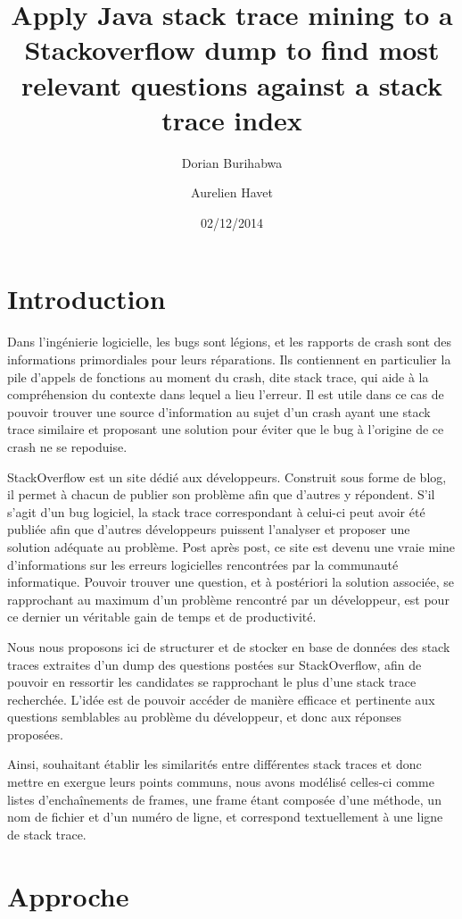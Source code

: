 \documentclass[11pt,a4paper]{article}
\author{Dorian Burihabwa \and Aurelien Havet}
\title{Apply Java stack trace mining to a Stackoverflow dump to find most relevant questions against a stack trace index}
\date{02/12/2014}
\begin{document}
\maketitle
\tableofcontents
\section{Introduction}
Dans l'ingénierie logicielle, les bugs sont légions, et les rapports de crash sont des informations primordiales pour leurs réparations. Ils contiennent en particulier la pile d'appels de fonctions au moment du crash, dite stack trace, qui aide à la compréhension du contexte dans lequel a lieu l'erreur. Il est utile dans ce cas de pouvoir trouver une source d'information au sujet d'un crash ayant une stack trace similaire et proposant une solution pour éviter que le bug à l'origine de ce crash ne se repoduise.

StackOverflow\cite{SO} est un site dédié aux développeurs. Construit sous forme de blog, il permet à chacun de publier son problème afin que d'autres y répondent. S'il s'agit d'un bug logiciel, la stack trace correspondant à celui-ci peut avoir été publiée afin que d'autres développeurs puissent l'analyser et proposer une solution adéquate au problème. Post après post, ce site est devenu une vraie mine d'informations sur les erreurs logicielles rencontrées par la communauté informatique. Pouvoir trouver une question, et à postériori la solution associée, se rapprochant au maximum d'un problème rencontré par un développeur, est pour ce dernier un véritable gain de temps et de productivité.
\newline

Nous nous proposons ici de structurer et de stocker en base de données des stack traces extraites d'un dump des questions postées sur StackOverflow, afin de pouvoir en ressortir les candidates se rapprochant le plus d'une stack trace recherchée. L'idée est de pouvoir accéder de manière efficace et pertinente aux questions semblables au problème du développeur, et donc aux réponses proposées.

Ainsi, souhaitant établir les similarités entre différentes stack traces et donc mettre en exergue leurs points communs, nous avons modélisé celles-ci comme listes d'enchaînements de frames, une frame étant composée d'une méthode, un nom de fichier et d'un numéro de ligne, et correspond textuellement à une ligne de stack trace.

\section{Approche}
\end{document}
